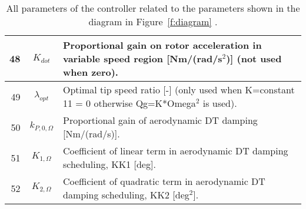 \begin{table}[t!]
\begin{center}
\begin{tabular}{r|c|p{11.5cm}}
\hline
48 &  		$K_{dot}$	& Proportional gain on rotor acceleration in variable speed region [Nm/(rad/s${}^2$)] (not used when zero). \\
\hline
49 &  	$\lambda_{opt}$	& Optimal tip speed ratio [-] (only used when K=constant 11 = 0 otherwise  Qg=K*Omega${}^2$ is used). \\
\hline
50 &  	$k_{P,0,\Omega}$	& Proportional gain of aerodynamic DT damping [Nm/(rad/s)]. \\
51 &  	$K_{1,\Omega}$	& Coefficient of linear term in aerodynamic DT damping scheduling, KK1 [deg]. \\
52 &	$K_{2,\Omega}$	& Coefficient of quadratic term in aerodynamic DT damping scheduling, KK2 [deg${}^2$]. \\
\end{tabular}
\caption{All parameters of the controller related to the parameters shown in the diagram in Figure~\ref{f:diagram} . \label{t:par}}
\end{center}
\end{table}




